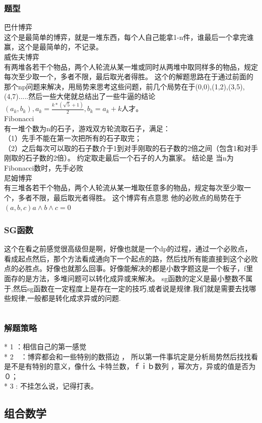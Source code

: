 \documentclass[a4paper,13.6pt]{article}
\begin{document}
\begin{CJK}{UTF8}{gbsn}
\subsubsection{题型}
巴什博弈\\
这个是最简单的博弈，就是一堆东西，每个人自己能拿1-n件，谁最后一个拿完谁赢，这个是最简单的，不记录。
\\威佐夫博弈\\
有两堆各若干个物品，两个人轮流从某一堆或同时从两堆中取同样多的物品，规定每次至少取一个，多者不限，最后取光者得胜。
这个的解题思路在于通过前面的那个np问题来解决，用局势来思考这些问题，前几个局势在于(0,0),(1,2),(3,5),(4,7).....然后一些大佬就总结出了一些牛逼的结论$( a_k,b_k),a_k=\frac{k*(\sqrt{5}+1)}{2} , b_k=a_k+k$人才。
\\Fibonacci\\
有一堆个数为n的石子，游戏双方轮流取石子，满足：
\\（1）先手不能在第一次把所有的石子取完；
\\（2）之后每次可以取的石子数介于1到对手刚取的石子数的2倍之间（包含1和对手刚取的石子数的2倍）。 约定取走最后一个石子的人为赢家。
结论是 当n为Fibonacci数时，先手必败
\\尼姆博弈\\
有三堆各若干个物品，两个人轮流从某一堆取任意多的物品，规定每次至少取一个，多者不限，最后取光者得胜。
这个博弈有点意思 他的必败点的局势在于$(a,b,c) a \land {b \land c} = 0$
\subsubsection{SG函数}
这个在看之前感觉很高级但是啊，好像也就是一个dp的过程，通过一个必败点，看成起点然后，那个方法看成通向下一个起点的路，然后找所有能直接到这个必败点的必胜点。好像也就那么回事。好像能解决的都是小数字题这是一个板子，f里面存的是方法，多堆问题可以转化成异或来解决。
sg函数的定义是最小整数不属于,然后sg函数在一定程度上是存在一定的技巧,或者说是规律.我们就是需要去找哪些规律,一般都是转化成求异或的问题.
\inputminted{c++}{../scoure/math/boyi.cpp}
\subsubsection{解题策略}
* 1  ：相信自己的第一感觉\\
* 2　：博弈都会和一些特别的数搭边 ， 所以第一件事坑定是分析局势然后找找看是不是有特别的意义，像什么 卡特兰数，ｆｉｂ数列 ，幂次方，异或的值是否为０；\\
* 3  : 不挂怎么说，记得打表。\\
\subsection{组合数学}

\end{CJK}
\end{document}
